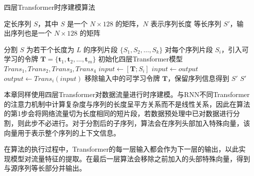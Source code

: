 \begin{algorithm}[htb]
\caption{四层Transformer时序建模算法}
\begin{algorithmic}
\REQUIRE 定长序列 $S$，其中 $S$ 是一个 $N \times 128$ 的矩阵，$N$ 表示序列长度
\ENSURE 等长序列 $S'$，输出序列也是一个 $N \times 128$ 的矩阵

\STATE 分割 $S$ 为若干个长度为 $L$ 的序列片段 $\{S_1, S_2, \ldots, S_k\}$
\STATE 对每个序列片段 $S_i$，引入可学习的令牌 $\mathbf{T} = \{\mathbf{t}_1, \mathbf{t}_2, \ldots, \mathbf{t}_m\}$
\STATE 初始化四层Transformer模型 $Trans_1, Trans_2, Trans_3, Trans_4$
        \STATE $input \gets [\mathbf{T}; S_i]$  
    \ELSE
        \STATE $input \gets output$  
    \ENDIF
    \STATE $output \gets Trans_i(input)$ 
        \STATE 移除输入中的可学习令牌 $\mathbf{T}$，保留序列信息得到 $S'$
    \ENDIF
\ENDFOR
\RETURN $S'$
\end{algorithmic}
\label{alg:transformer_serial}
\end{algorithm}

本章同样使用四层Transformer对数据流量进行时序建模。与RNN不同Transformer的注意力机制中计算复杂度与序列的长度呈平方关系而不是线性关系，因此在算法的第1步会将网络流量切为长度相同的短片段，若数据预处理中已对数据进行分割，则此步不必进行。对于分割后的子序列，算法会在序列头部加入特殊向量，该向量用于表示整个序列的上下文信息。

在算法的执行过程中，Transformer的每一层输入都会作为下一层的输出，以此实现模型对流量特征的提取。在最后一层算法会移除之前加入的头部特殊向量，得到与源序列等长部分并输出。



